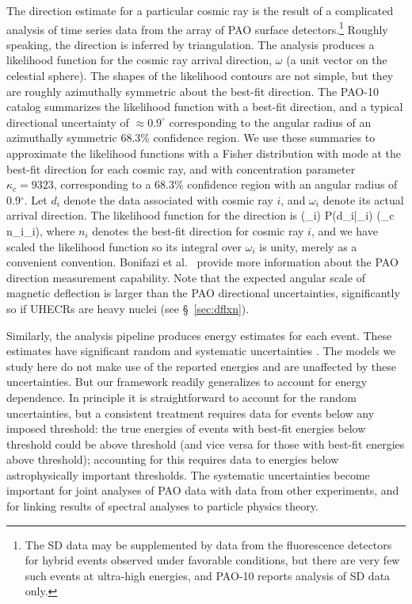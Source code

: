 The direction estimate for a particular cosmic ray is the result of a
complicated analysis of time series data from the array of PAO surface
detectors.\footnote{The SD data may be supplemented by data from the
fluorescence detectors for hybrid events observed under favorable
conditions, but there are very few such events at ultra-high energies,
and PAO-10 reports analysis of SD data only.}
Roughly speaking, the direction is inferred by triangulation. 
The analysis produces a likelihood function for the cosmic ray arrival
direction, $\omega$ (a unit vector on the celestial sphere).  The shapes of
the likelihood contours are not simple, but they are roughly azimuthally
symmetric about the best-fit direction.  The PAO-10 catalog summarizes the
likelihood function with a best-fit direction, and a typical directional
uncertainty of $\approx 0.9^\circ$ corresponding to the angular radius of an
azimuthally symmetric 68.3\% confidence region.  We use these summaries to
approximate the likelihood functions with a Fisher distribution with mode at
the best-fit direction for each cosmic ray, and with concentration parameter
$\kappa_c = 9323$, corresponding to a 68.3\% confidence region with an
angular radius of 0.9$^\circ$.  Let $d_i$ denote the data associated with
cosmic ray $i$, and $\omega_i$ denote its actual arrival direction.  The
likelihood function for the direction is
\ba
\ell(\omega_i)
  \coloneqq P(d_i|\omega_i)
   \approx {} \exp(\kappa_c n_i\cdot\omega_i),
\label{ell-def}
\ea
where $n_i$ denotes the best-fit direction for cosmic ray $i$, and we have
scaled the likelihood function so its integral over $\omega_i$ is unity,
merely as a convenient convention.  Bonifazi et al.\
\cite{B+PAO09-DrxnUncert} provide more information about the PAO direction
measurement capability.  Note that the expected angular scale of magnetic
deflection is larger than the PAO directional uncertainties, significantly
so if UHECRs are heavy nuclei (see \S~\ref{sec:dflxn}).

Similarly, the analysis pipeline produces energy estimates for each event.
These estimates have significant random and systematic uncertainties
\cite{PAO08-GZK,PAO10-GZK}.
The models we study here do not make use of the reported energies and are
unaffected by these uncertainties.  But our framework readily generalizes to
account for energy dependence.  In principle it is straightforward to account
for the random uncertainties, but a consistent treatment requires data for
events below any imposed threshold:  the true energies of events with best-fit
energies below threshold could be above threshold (and vice versa for those
with best-fit energies above threshold); accounting for this requires data to
energies below astrophysically important thresholds.  The systematic
uncertainties become important for joint analyses of PAO data with data from
other experiments, and for linking results of spectral analyses to particle
physics theory.



